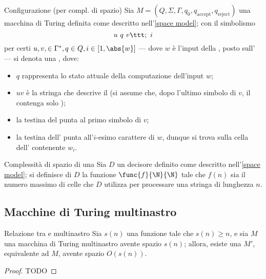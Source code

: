 \documentclass[a4paper, 12pt]{report}
\begin{document}
    \begin{frameddefn}[breakable]{Configurazione (\TM per compl. di spazio)}
        Sia $M = (Q, \Sigma, \Gamma, q_0, q_\mathrm{accept}, q_\mathrm{reject})$ una macchina di Turing definita come descritto nell'\cref{space model}; con il simbolismo $$u \ q \ v \ttt ; \ i$$ per certi $u, v, \in \Gamma^*, q \in Q, i \in [1, \abs{w}]$ --- dove $w$ è l'input della \TM, posto sull' --- si denota una , dove:

        \begin{itemize}
            \item $q$ rappresenta lo stato attuale della computazione dell'input $w$;
            \item $uv$ è la stringa che descrive il  (si assume che, dopo l'ultimo simbolo di $v$, il  contenga solo \blankchar);
            \item la testina del  punta al primo simbolo di $v$;
            \item la testina dell' punta all'$i$-esimo carattere di $w$, dunque si trova sulla cella dell' contenente $w_i$.
        \end{itemize}
    \end{frameddefn}

    \begin{frameddefn}[label={space complexity}]{Complessità di spazio di una \TM}
        Sia $D$ un decisore definito come descritto nell'\cref{space model}; si definisce  di $D$ la funzione $\func{f}{\N}{\N}$ tale che $f(n)$ sia il numero massimo di celle che $D$ utilizza per processare una stringa di lunghezza $n$.
    \end{frameddefn}

    \subsection{Macchine di Turing multinastro}
    
    \begin{framedthm}[label={multitape tm space equiv}]{Relazione tra \TM e \TM multinastro}
        Sia $s(n)$ una funzione tale che $s(n) \ge n$, e sia $M$ una macchina di Turing multinastro avente spazio $s(n)$; allora, esiste una \TM $M'$, equivalente ad $M$, avente spazio $O(s(n))$.
    \end{framedthm}

    \begin{proof}
        TODO
    \end{proof}
\end{document}
